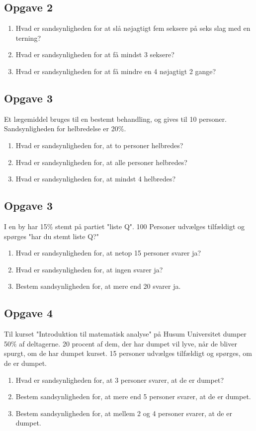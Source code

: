 \subsection*{Opgave 2}
\begin{enumerate}[label=\roman*)]
	\item Hvad er sandsynligheden for at slå nøjagtigt fem seksere på seks slag med en terning?
	\item Hvad er sandsynligheden for at få mindst 3 seksere?
	\item Hvad er sandsynligheden for at få mindre en 4 nøjagtigt 2 gange?
\end{enumerate}
\subsection*{Opgave 3}
Et lægemiddel bruges til en bestemt behandling, og gives til 10 personer. Sandsynligheden for helbredelse er 20$\%$. 
\begin{enumerate}[label=\roman*)]
	\item Hvad er sandsynligheden for, at to personer helbredes?
	\item Hvad er sandsynligheden for, at alle personer helbredes?
	\item Hvad er sandsynligheden for, at mindst 4 helbredes? 
\end{enumerate}

\subsection*{Opgave 3}
I en by har 15$\%$ stemt på partiet "liste Q". 100 Personer udvælges tilfældigt og spørges "har du stemt liste Q?"
\begin{enumerate}[label=\roman*)]
	\item Hvad er sandsynligheden for, at netop 15 personer svarer ja?
	\item Hvad er sandsynligheden for, at ingen svarer ja?
	\item Bestem sandsynligheden for, at mere end 20 svarer ja. 
\end{enumerate}

\subsection*{Opgave 4}
Til kurset "Introduktion til matematisk analyse" på Husum Universitet dumper 50$\%$ af deltagerne. 20 procent af dem, der har dumpet vil lyve, når de bliver spurgt, om de har dumpet kurset. 15 personer udvælges tilfældigt og spørges, om de er dumpet. 
\begin{enumerate}[label=\roman*)]
	\item Hvad er sandsynligheden for, at 3 personer svarer, at de er dumpet?
	\item Bestem sandsynligheden for, at mere end 5 personer svarer, at de er dumpet.
	\item Bestem sandsynligheden for, at mellem 2 og 4 personer svarer, at de er dumpet. 
\end{enumerate}